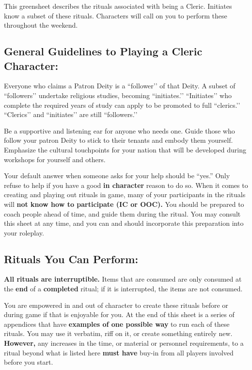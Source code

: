 \documentclass[green]{GL2020}
\begin{document}
\name{\gFPFCleric{}}

This greensheet describes the rituals associated with being a Cleric. Initiates know a subset of these rituals. Characters will call on you to perform these throughout the weekend. 

\subsection*{General Guidelines to Playing a Cleric Character:}
Everyone who claims a Patron Deity is a ``follower’’ of that Deity. A subset of ``followers’’ undertake religious studies, becoming ``initiates.’’ ``Initiates’’ who complete the required years of study can apply to be promoted to full ``clerics.’’ ``Clerics’’ and ``initiates’’ are still ``followers.’’

Be a supportive and listening ear for anyone who needs one. Guide those who follow your patron Deity to stick to their tenants and embody them yourself. Emphasize the cultural touchpoints for your nation that will be developed during workshops for yourself and others.

Your default answer when someone asks for your help should be ``yes.'' Only refuse to help if you have a good \textbf{in character} reason to do so. When it comes to creating and playing out rituals in game, many of your participants in the rituals will \textbf{not know how to participate (IC or OOC).} You should be prepared to coach people ahead of time, and guide them during the ritual. You may consult this sheet at any time, and you can and should incorporate this preparation into your roleplay.

\subsection*{Rituals You Can Perform:}
\textbf{All rituals are interruptible.} Items that are consumed are only consumed at the \textbf{end} of a \textbf{completed} ritual; if it is interrupted, the items are not consumed.

You are empowered in and out of character to create these rituals before or during game if that is enjoyable for you. At the end of this sheet is a series of appendices that have \textbf{examples of one possible way} to run each of these rituals. You may use it verbatim, riff on it, or create something entirely new. \textbf{However,} any increases in the time, or material or personnel requirements, to a ritual beyond what is listed here \textbf{must have} buy-in from all players involved before you start.
\end{document}
